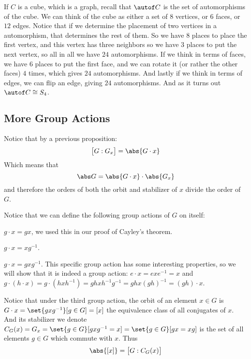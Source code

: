 \documentclass[10pt]{article}
\begin{document}


\bigskip

If $C$ is a cube, which is a graph, recall that $\autof C$ is the set of automorphisms of the cube.
We can think of the cube as either a set of $8$ vertices, or $6$ faces, or $12$ edges.
Notice that if we determine the placement of two vertices in a automorphism, that determines the rest of them.
So we have $8$ places to place the first vertex, and this vertex has three neighbors so we have $3$ places to put the next vertex, so all in all we have $24$ automorphisms.
If we think in terms of faces, we have $6$ places to put the first face, and we can rotate it (or rather the other faces) $4$ times, which gives $24$ automorphisms.
And lastly if we think in terms of edges, we can flip an edge, giving $24$ automorphisms.
And as it turns out $\autof C\cong S_4$.

\subsection{More Group Actions}

Notice that by a previous proposition:
\[ \bigl[G:G_x\bigr] = \abs{G\cdot x} \]
Which means that
\[ \abs G = \abs{G\cdot x}\cdot\abs{G_x} \]
and therefore the orders of both the orbit and stabilizer of $x$ divide the order of $G$.

Notice that we can define the following group actions of $G$ on itself:
\blist
    \item $g\cdot x=gx$, we used this in our proof of Cayley's theorem.
    \item $g\cdot x=xg^{-1}$.
    \item $g\cdot x=gxg^{-1}$. This specific group action has some interesting properties, so we will show that it is indeed a group action:
    $e\cdot x=exe^{-1}=x$ and $g\cdot(h\cdot x)=g\cdot(hxh^{-1})=ghxh^{-1}g^{-1}=ghx(gh)^{-1}=(gh)\cdot x$.
\elist

Notice that under the third group action, the orbit of an element $x\in G$ is $G\cdot x=\set{gxg^{-1}}[g\in G]=[x]$ the equivalence class of all conjugates of $x$.
And its stabilizer we denote $C_G(x)=G_x=\set{g\in G}[gxg^{-1}=x]=\set{g\in G}[gx=xg]$ is the set of all elements $g\in G$ which commute with $x$.
Thus
\[ \abs{[x]} = \bigl[G:C_G(x)\bigr] \]
\end{document}
